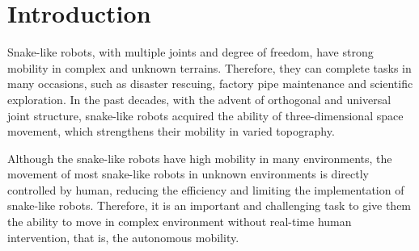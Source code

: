 \section{Introduction}
Snake-like robots, with multiple joints and degree of freedom, 
have strong mobility in complex and unknown terrains\cite{Chirikjian1995The}. 
Therefore, they can complete tasks in many occasions, such as disaster 
rescuing\cite{DogAndSnake}, factory pipe maintenance\cite{ACMTutorial} 
and scientific exploration\cite{Kuwada2007Snake}. In the past decades, 
with the advent of orthogonal and universal joint structure\cite{1014757}\cite{Date2005Control}\cite{GaitBasedCompliant}, 
snake-like robots acquired the ability of three-dimensional space movement, 
which strengthens their mobility in varied topography. 

Although the snake-like robots have high mobility in many environments, the movement of most snake-like robots in unknown environments is 
directly controlled by human, reducing the efficiency and limiting the 
implementation of snake-like robots. Therefore, it is an important and challenging 
task to give them the ability to move in complex environment
without real-time human intervention, that is, the autonomous mobility.


